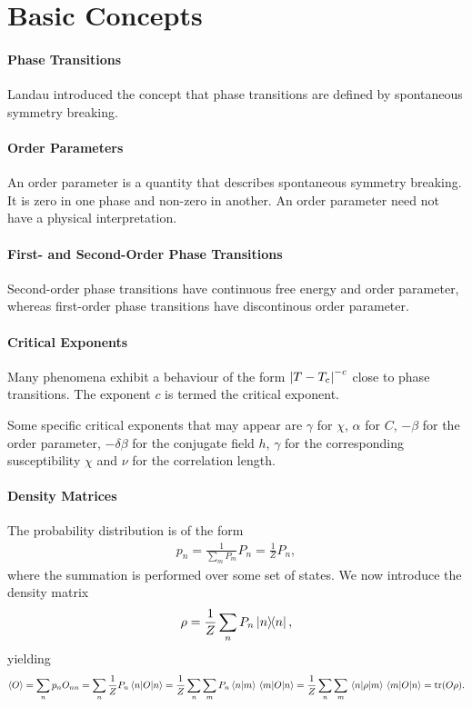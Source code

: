 \section{Basic Concepts}

\paragraph{Phase Transitions}
Landau introduced the concept that phase transitions are defined by spontaneous symmetry breaking.

\paragraph{Order Parameters}
An order parameter is a quantity that describes spontaneous symmetry breaking. It is zero in one phase and non-zero in another. An order parameter need not have a physical interpretation.

\paragraph{First- and Second-Order Phase Transitions}
Second-order phase transitions have continuous free energy and order parameter, whereas first-order phase transitions have discontinous order parameter.

\paragraph{Critical Exponents}
Many phenomena exhibit a behaviour of the form $\abs{T - T_{\text{c}}}^{-c}$ close to phase transitions. The exponent $c$ is termed the critical exponent.

Some specific critical exponents that may appear are $\gamma$ for $\chi$, $\alpha$ for $C$, $-\beta$ for the order parameter, $-\delta\beta$ for the conjugate field $h$, $\gamma$ for the corresponding susceptibility $\chi$ and $\nu$ for the correlation length.

\paragraph{Density Matrices}
The probability distribution is of the form
\begin{align*}
	p_{n} = \frac{1}{\sum\limits_{m}P_{m}}P_{n} = \frac{1}{Z}P_{n},
\end{align*}
where the summation is performed over some set of states. We now introduce the density matrix
\begin{align*}
	\rho = \frac{1}{Z}\sum\limits_{n}P_{n}\op{n}{n},
\end{align*}
yielding
\begin{align*}
	\expval{O} = \sum\limits_{n}p_{n}O_{nn} = \sum\limits_{n}\frac{1}{Z}P_{n}\expval{O}{n} = \frac{1}{Z}\sum\limits_{n}\sum\limits_{m}P_{n}\braket{n}{m}\mel{m}{O}{n} = \frac{1}{Z}\sum\limits_{n}\sum\limits_{m}\mel{n}{\rho}{m}\mel{m}{O}{n} = \tr(O\rho).
\end{align*}

